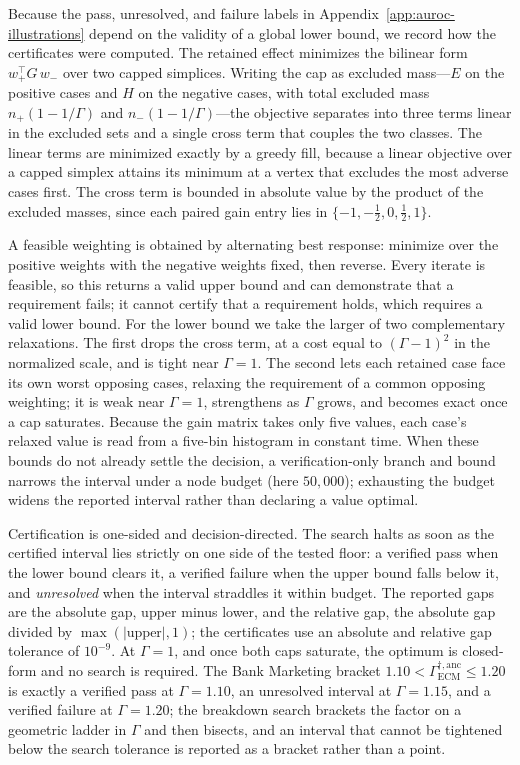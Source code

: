 \documentclass[11pt]{article}
\theoremstyle{remark}
\begin{document}
Because the pass, unresolved, and failure labels in
Appendix~\ref{app:auroc-illustrations} depend on the validity of a global lower
bound, we record how the certificates were computed. The retained effect
minimizes the bilinear form $w_+^\top G\,w_-$ over two capped simplices. Writing
the cap as excluded mass---$E$ on the positive cases and $H$ on the negative
cases, with total excluded mass $n_+(1-1/\Gamma)$ and $n_-(1-1/\Gamma)$---the
objective separates into three terms linear in the excluded sets and a single
cross term that couples the two classes. The linear terms are minimized exactly
by a greedy fill, because a linear objective over a capped simplex attains its
minimum at a vertex that excludes the most adverse cases first. The cross term
is bounded in absolute value by the product of the excluded masses, since each
paired gain entry lies in $\{-1,-\tfrac12,0,\tfrac12,1\}$.

A feasible weighting is obtained by alternating best response: minimize over the
positive weights with the negative weights fixed, then reverse. Every iterate is
feasible, so this returns a valid upper bound and can demonstrate that a
requirement fails; it cannot certify that a requirement holds, which requires a
valid lower bound. For the lower bound we take the larger of two complementary
relaxations. The first drops the cross term, at a cost equal to $(\Gamma-1)^2$ in
the normalized scale, and is tight near $\Gamma=1$. The second lets each
retained case face its own worst opposing cases, relaxing the requirement of a
common opposing weighting; it is weak near $\Gamma=1$, strengthens as $\Gamma$
grows, and becomes exact once a cap saturates. Because the gain matrix takes
only five values, each case's relaxed value is read from a five-bin histogram in
constant time. When these bounds do not already settle the decision, a
verification-only branch and bound narrows the interval under a node budget
(here $50{,}000$); exhausting the budget widens the reported interval rather than
declaring a value optimal.

Certification is one-sided and decision-directed. The search halts as soon as
the certified interval lies strictly on one side of the tested floor: a verified
pass when the lower bound clears it, a verified failure when the upper bound
falls below it, and \emph{unresolved} when the interval straddles it within
budget. The reported gaps are the absolute gap, upper minus lower, and the
relative gap, the absolute gap divided by $\max(|\text{upper}|,1)$; the
certificates use an absolute and relative gap tolerance of $10^{-9}$. At
$\Gamma=1$, and once both caps saturate, the optimum is closed-form and no
search is required. The Bank Marketing bracket
$1.10<\Gamma_{\mathrm{ECM}}^{\dagger,\mathrm{anc}}\leq1.20$ is exactly a verified
pass at $\Gamma=1.10$, an unresolved interval at $\Gamma=1.15$, and a verified
failure at $\Gamma=1.20$; the breakdown search brackets the factor on a
geometric ladder in $\Gamma$ and then bisects, and an interval that cannot be
tightened below the search tolerance is reported as a bracket rather than a
point.
\end{document}
